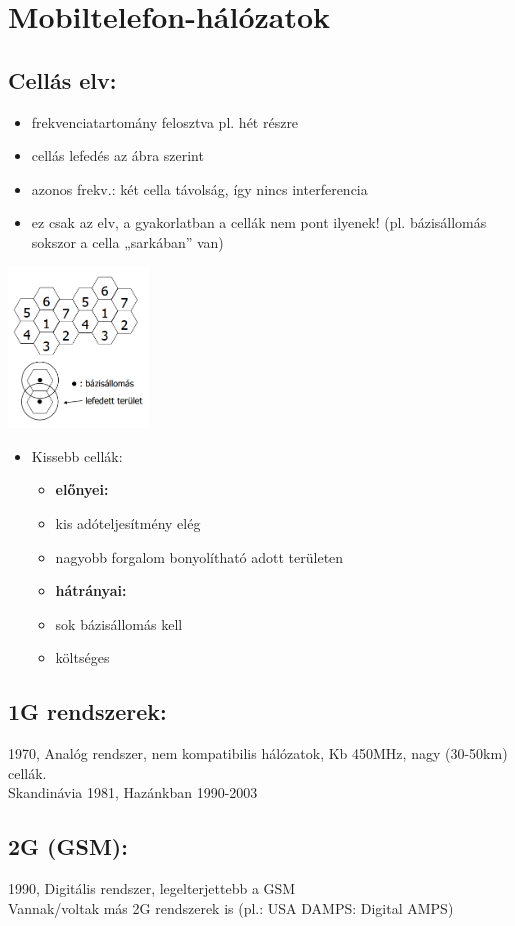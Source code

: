 \documentclass[10pt,a4paper]{article}
\begin{document}
\section{Mobiltelefon-hálózatok}
\subsection{Cellás elv:}
\begin{itemize}
\item frekvenciatartomány felosztva pl. hét részre
\item cellás lefedés az ábra szerint
\item 	azonos frekv.: két cella távolság, így nincs
	interferencia
\item ez csak az elv, a gyakorlatban a cellák nem
	pont ilyenek! (pl. bázisállomás sokszor a cella
	„sarkában” van)
\end{itemize}
\begin{center}
		\includegraphics[width=0.28\textwidth]{src/Cella}
\end{center}
\begin{itemize}
	\item Kissebb cellák:
	\begin{itemize}
		\item \textbf{előnyei:}
		\item kis adóteljesítmény elég
		\item nagyobb forgalom bonyolítható adott területen
		\item \textbf{hátrányai:}
		\item sok bázisállomás kell
		\item költséges
	\end{itemize}
\end{itemize}
\subsection{1G rendszerek:} 1970, Analóg rendszer, nem kompatibilis hálózatok, Kb 450MHz, nagy (30-50km) cellák.\\Skandinávia 1981, Hazánkban 1990-2003
 \subsection{2G (GSM):} 1990, Digitális rendszer, legelterjettebb a GSM\\Vannak/voltak más 2G rendszerek is (pl.: USA DAMPS: Digital AMPS)
 \newpage
\end{document}
